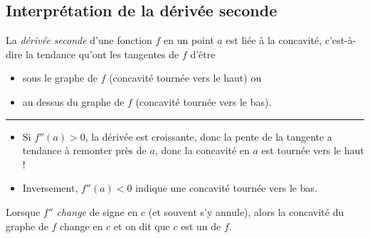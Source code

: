 \subsection{Interprétation de la dérivée seconde}
\begin{frame}
La \emph{dérivée seconde} d'une fonction $f$ en un point $a$ est liée à la concavité\pause,
c'est-à-dire la tendance qu'ont les tangentes de \(f\) d'être\pause
\begin{itemize}[<+->]
\item sous le graphe de \(f\) (concavité tournée vers le haut) ou
\item au dessus du graphe de \(f\) (concavité tournée vers le bas).
\end{itemize}
\pause
\hrule
\begin{itemize}%
\item Si \(f''(a) > 0\)\pause, la dérivée est croissante\pause, donc la pente de la tangente a tendance à remonter près de \(a\)\pause, donc la concavité en \(a\) est tournée vers le haut !\pause
\item Inversement, \(f''(a) < 0\) indique une concavité tournée vers le bas.
\end{itemize}

\begin{definition}
Lorsque $f''$ \emph{change} de signe en $c$ (et souvent s'y annule)\pause, alors la concavité du graphe de $f$ change en $c$\pause{} et on dit que $c$ est un  de $f$.
\end{definition}
\end{frame}
\begin{frame}
\begin{center}

\end{center}
\end{frame}

